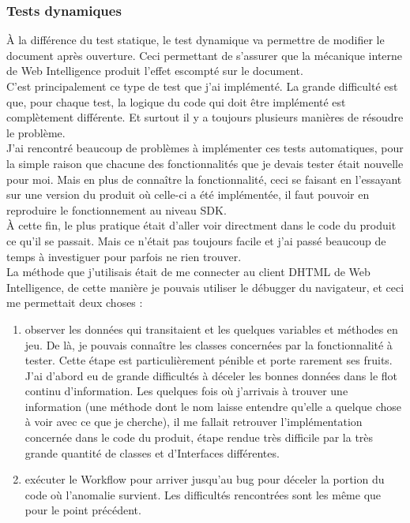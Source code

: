 \subsubsection{Tests dynamiques}

\`{A} la diff\'{e}rence du test statique, le test dynamique va permettre de modifier le document apr\`{e}s ouverture. Ceci permettant de s'assurer que la m\'{e}canique interne de Web Intelligence produit l'effet escompt\'{e} sur le document.\\
C'est principalement ce type de test que j'ai impl\'{e}ment\'{e}. La grande difficult\'{e} est que, pour chaque test, la logique du code qui doit \^{e}tre impl\'{e}ment\'{e} est compl\`{e}tement diff\'{e}rente. Et surtout il y a toujours plusieurs mani\`{e}res de r\'{e}soudre le probl\`{e}me.\\
J'ai rencontr\'{e} beaucoup de probl\`{e}mes \`{a} impl\'{e}menter ces tests automatiques, pour la simple raison que chacune des fonctionnalit\'{e}s que je devais tester \'{e}tait nouvelle pour moi. Mais en plus de conna\^{i}tre la fonctionnalit\'{e}, ceci se faisant en l'essayant sur une version du produit o\`{u} celle-ci a \'{e}t\'{e} impl\'{e}ment\'{e}e, il faut pouvoir en reproduire le fonctionnement au niveau SDK.\\
\`{A} cette fin, le plus pratique \'{e}tait d'aller voir directment dans le code du produit ce qu'il se passait. Mais ce n'\'{e}tait pas toujours facile et j'ai pass\'{e} beaucoup de temps \`{a} investiguer pour parfois ne rien trouver.\\
La m\'{e}thode que j'utilisais \'{e}tait de me connecter au client DHTML de Web Intelligence, de cette mani\`{e}re je pouvais utiliser le d\'{e}bugger du navigateur, et ceci me permettait deux choses :
\begin{enumerate}
	\item observer les donn\'{e}es qui transitaient et les quelques variables et m\'{e}thodes en jeu. De l\`{a}, je pouvais conna\^{i}tre les classes concern\'{e}es par la fonctionnalit\'{e} \`{a} tester. Cette \'{e}tape est particuli\`{e}rement p\'{e}nible et porte rarement ses fruits. J'ai d'abord eu de grande difficult\'{e}s \`{a} d\'{e}celer les bonnes donn\'{e}es dans le flot continu d'information. Les quelques fois o\`{u} j'arrivais \`{a} trouver une information (une m\'{e}thode dont le nom laisse entendre qu'elle a quelque chose \`{a} voir avec ce que je cherche), il me fallait retrouver l'impl\'{e}mentation concern\'{e}e dans le code du produit, \'{e}tape rendue tr\`{e}s difficile par la tr\`{e}s grande quantit\'{e} de classes et d'\gls{Interface}s diff\'{e}rentes.
	\item ex\'{e}cuter le \gls{Workflow} pour arriver jusqu'au bug pour d\'{e}celer la portion du code o\`{u} l'anomalie survient. Les difficult\'{e}s rencontr\'{e}es sont les m\^{e}me que pour le point pr\'{e}c\'{e}dent.
\end{enumerate}



